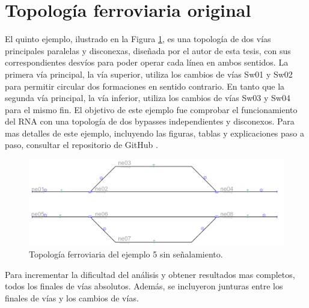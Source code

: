 \section{Topología ferroviaria original}

	El quinto ejemplo, ilustrado en la Figura \ref{fig:EJ5_1}, es una topología de dos vías principales paralelas y disconexas, diseñada por el autor de esta tesis, con sus correspondientes desvíos para poder operar cada línea en ambos sentidos. La primera vía principal, la vía superior, utiliza los cambios de vías Sw01 y Sw02 para permitir circular dos formaciones en sentido contrario. En tanto que la segunda vía principal, la vía inferior, utiliza los cambios de vías Sw03 y Sw04 para el mismo fin. El objetivo de este ejemplo fue comprobar el funcionamiento del RNA con una topología de dos bypasses independientes y disconexos. Para mas detalles de este ejemplo, incluyendo las figuras, tablas y explicaciones paso a paso, consultar el repositorio de GitHub \cite{GITHUB_PHD}.
	
	\begin{figure}[h]
		\centering
		\includegraphics[width=1\textwidth]{resultados-obtenidos/ejemplo5/images/5_empty.png}
		\centering\caption{Topología ferroviaria del ejemplo 5 sin señalamiento.}
		\label{fig:EJ5_1}
	\end{figure}
	
	Para incrementar la dificultad del análisis y obtener resultados mas completos, todos los finales de vías absolutos. Además, se incluyeron junturas entre los finales de vías y los cambios de vías.
